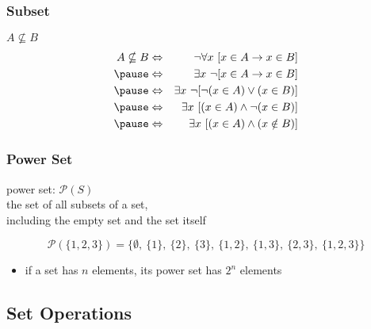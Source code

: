 \documentclass[dvipsnames]{beamer}
\begin{document}
\begin{frame}
  \frametitle{Subset}

  \begin{block}{$A \nsubseteq B$}
    \begin{eqnarray*}
      A \nsubseteq B & \Leftrightarrow
                     & \neg \forall x~[x \in A \rightarrow x \in B]\\\pause
                     & \Leftrightarrow
                     & \exists x~\neg [x \in A \rightarrow x \in B]\\\pause
                     & \Leftrightarrow
                     & \exists x~\neg [\neg (x \in A) \vee (x \in B)]\\\pause
                     & \Leftrightarrow
                     & \exists x~[(x \in A) \wedge \neg (x \in B)]\\\pause
                     & \Leftrightarrow
                     & \exists x~[(x \in A) \wedge (x \notin B)]
    \end{eqnarray*}
  \end{block}
\end{frame}

\begin{frame}
  \frametitle{Power Set}

  \begin{definition}
    \alert{power set}: $\mathcal{P}(S)$\\
    the set of all subsets of a set,\\
    including the empty set and the set itself
  \end{definition}

  \begin{example}
    \vspace{-2em}
    \[
      \mathcal{P}(\{1,2,3\}) =
        \{\emptyset,~\{1\},~\{2\},
          ~\{3\},~\{1,2\},~\{1,3\},~\{2,3\},~\{1,2,3\}\}
    \]
  \end{example}

  \begin{itemize}
    \item if a set has $n$ elements, its power set has $2^n$ elements
  \end{itemize}
\end{frame}

\subsection{Set Operations}
\end{document}
